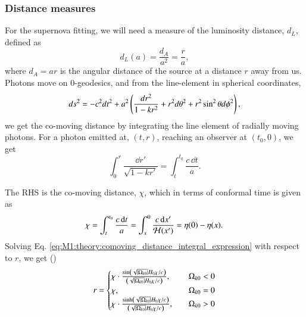 \subsubsection{Distance measures} 

For the supernova fitting, we will need a measure of the luminosity distance, $d_L$, defined as 
%
\begin{equation}
    d_L(a) = \frac{d_A}{a^2} = \frac{r}{a}, \label{eq:m1:theory:dL_of_a_general expression}
\end{equation} 
where $d_A=ar$ is the angular distance of the source at a distance $r$ away from us. Photons move on $0$-geodesics, and from the line-element in spherical coordinates,
\begin{equation}
    ds^2 = -c^2 dt^2 + a^2 \left( \frac{dr^2}{1-kr^2} + r^2 d\theta^2 + r^2 \sin^2\theta d\phi^2 \right), \label{eq:M1:theory:FLRW_general_nonflat_spherical}
\end{equation} 
we get the co-moving distance by integrating the line element of radially moving photons. For a photon emitted at, $(t,r)$, reaching an observer at $(t_0, 0)$, we get 
\begin{equation}
    \int_0^r \frac{\dd r'}{\sqrt{1-k r'}} = \int_t^{t_0} \frac{c\,\dd t}{a}. \label{eq:M1:theory:comoving_distance_integral_expression}
\end{equation} 
%

The RHS is the co-moving distance, $\chi$, which in terms of conformal time is given as  
\begin{equation}
    \chi = \int_t^{t_0} \frac{c\,\dd t}{a} = \int_x^0 \frac{c\,\dd x'}{\mathcal{H}(x')} = \eta(0) - \eta(x). \label{eq:M1:theory:chi_eta0_minus_eta_of_x}
\end{equation}
%
Solving Eq. \eqref{eq:M1:theory:comoving_distance_integral_expression} with respect to $r$, we get ()
\begin{equation}
    r = \begin{cases}
        \chi\cdot \frac{\sin\left( \sqrt{\abs{\Omega_{k0}}} H_0 \chi / c \right)}{\left( \sqrt{\abs{\Omega_{k0}}} H_0 \chi / c \right)},\quad &\Omega_{k0} < 0 \\ 
        \chi,\quad &\Omega_{k0}=0 \\ 
        \chi\cdot \frac{\sinh\left( \sqrt{\abs{\Omega_{k0}}} H_0 \chi / c \right)}{\left( \sqrt{\abs{\Omega_{k0}}} H_0 \chi / c \right)},\quad &\Omega_{k0} > 0
    \end{cases}
\end{equation} 


